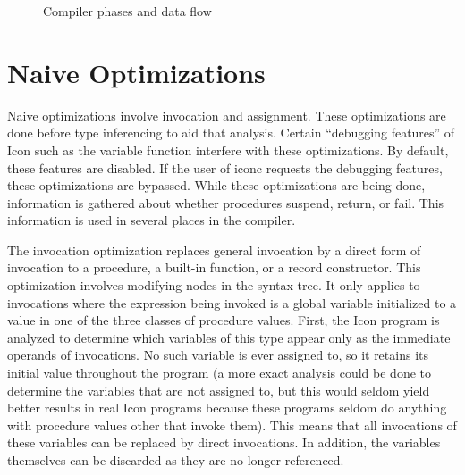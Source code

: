 \begin{figure}
\caption{Compiler phases and data flow}
\end{figure}

\section{Naive Optimizations}

Naive optimizations involve invocation and assignment. These
optimizations are done before type inferencing to aid that
analysis. Certain ``debugging features'' of Icon such as the
variable function interfere with these optimizations. By default,
these features are disabled. If the user of iconc requests the
debugging features, these optimizations are bypassed. While these
optimizations are being done, information is gathered about whether
procedures suspend, return, or fail. This information is used in
several places in the compiler.

The invocation optimization replaces general invocation by a direct
form of invocation to a procedure, a built-in function, or a record
constructor. This optimization involves modifying nodes in the syntax
tree. It only applies to invocations where the expression being
invoked is a global variable initialized to a value in one of the
three classes of procedure values. First, the Icon program is analyzed
to determine which variables of this type appear only as the immediate
operands of invocations. No such variable is ever assigned to, so it
retains its initial value throughout the program (a more exact
analysis could be done to determine the variables that are not
assigned to, but this would seldom yield better results in real Icon
programs because these programs seldom do anything with procedure
values other that invoke them). This means that all invocations of
these variables can be replaced by direct invocations. In addition,
the variables themselves can be discarded as they are no longer
referenced.

